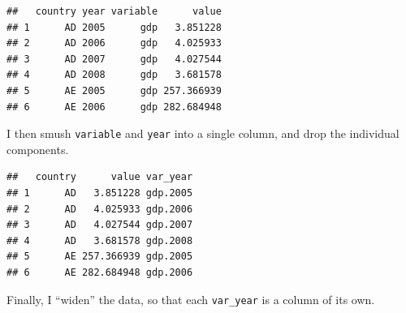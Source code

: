 \documentclass[12pt,oneside,openany]{book}
\newenvironment{Shaded}{\begin{snugshade}}{\end{snugshade}}
\newcommand{\KeywordTok}[1]{\textcolor[rgb]{0.13,0.29,0.53}{\textbf{#1}}}
\newcommand{\DataTypeTok}[1]{\textcolor[rgb]{0.13,0.29,0.53}{#1}}
\newcommand{\StringTok}[1]{\textcolor[rgb]{0.31,0.60,0.02}{#1}}
\newcommand{\OperatorTok}[1]{\textcolor[rgb]{0.81,0.36,0.00}{\textbf{#1}}}
\newcommand{\NormalTok}[1]{#1}
\begin{document}
\begin{verbatim}
##   country year variable      value
## 1      AD 2005      gdp   3.851228
## 2      AD 2006      gdp   4.025933
## 3      AD 2007      gdp   4.027544
## 4      AD 2008      gdp   3.681578
## 5      AE 2005      gdp 257.366939
## 6      AE 2006      gdp 282.684948
\end{verbatim}

I then smush \texttt{variable} and \texttt{year} into a single column,
and drop the individual components.

\begin{Shaded}
\end{Shaded}

\begin{verbatim}
##   country      value var_year
## 1      AD   3.851228 gdp.2005
## 2      AD   4.025933 gdp.2006
## 3      AD   4.027544 gdp.2007
## 4      AD   3.681578 gdp.2008
## 5      AE 257.366939 gdp.2005
## 6      AE 282.684948 gdp.2006
\end{verbatim}

Finally, I ``widen'' the data, so that each \texttt{var\_year} is a
column of its own.

\begin{Shaded}
\end{Shaded}
\end{document}
